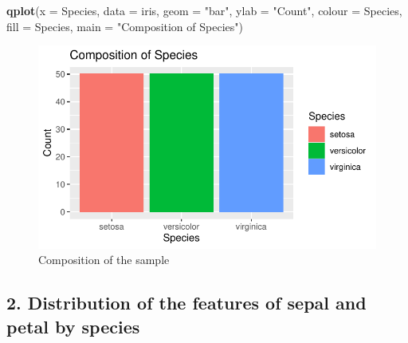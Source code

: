 \documentclass[]{article}
\newenvironment{Shaded}{\begin{snugshade}}{\end{snugshade}}
\newcommand{\DataTypeTok}[1]{\textcolor[rgb]{0.13,0.29,0.53}{#1}}
\newcommand{\KeywordTok}[1]{\textcolor[rgb]{0.13,0.29,0.53}{\textbf{#1}}}
\newcommand{\NormalTok}[1]{#1}
\newcommand{\StringTok}[1]{\textcolor[rgb]{0.31,0.60,0.02}{#1}}
\begin{document}
\begin{Shaded}
\begin{Highlighting}[]
\KeywordTok{qplot}\NormalTok{(}\DataTypeTok{x =}\NormalTok{ Species, }\DataTypeTok{data =}\NormalTok{ iris, }\DataTypeTok{geom =} \StringTok{"bar"}\NormalTok{, }\DataTypeTok{ylab =} \StringTok{"Count"}\NormalTok{, }
      \DataTypeTok{colour =}\NormalTok{ Species, }\DataTypeTok{fill =}\NormalTok{ Species,}
      \DataTypeTok{main =} \StringTok{"Composition of Species"}\NormalTok{)}
\end{Highlighting}
\end{Shaded}

\begin{figure}
\centering
\includegraphics{Week3Answers_files/figure-latex/unnamed-chunk-23-1.pdf}
\caption{Composition of the sample}
\end{figure}

\newpage

\hypertarget{distribution-of-the-features-of-sepal-and-petal-by-species}{%
\subsection{2. Distribution of the features of sepal and petal by
species}\label{distribution-of-the-features-of-sepal-and-petal-by-species}}
\end{document}
